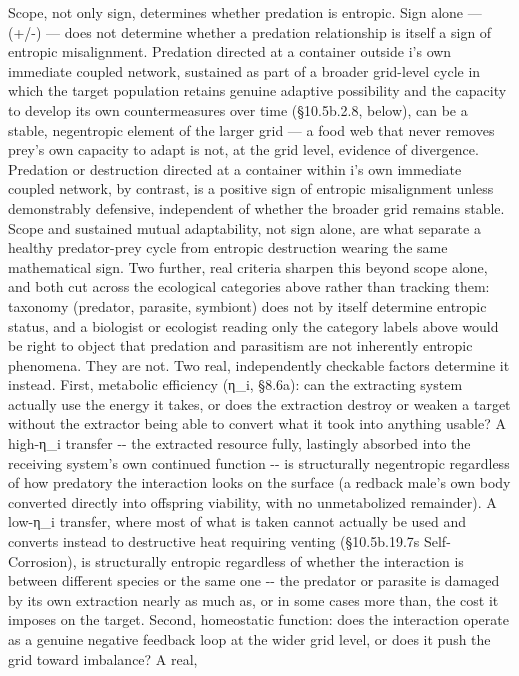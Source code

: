 \documentclass[
]{article}
\begin{document}
Scope, not only sign, determines whether predation is entropic. Sign
alone --- (+/-) --- does not determine whether a predation relationship
is itself a sign of entropic misalignment. Predation directed at a
container outside i's own immediate coupled network, sustained as part
of a broader grid-level cycle in which the target population retains
genuine adaptive possibility and the capacity to develop its own
countermeasures over time (§10.5b.2.8, below), can be a stable,
negentropic element of the larger grid --- a food web that never removes
prey's own capacity to adapt is not, at the grid level, evidence of
divergence. Predation or destruction directed at a container within i's
own immediate coupled network, by contrast, is a positive sign of
entropic misalignment unless demonstrably defensive, independent of
whether the broader grid remains stable. Scope and sustained mutual
adaptability, not sign alone, are what separate a healthy predator-prey
cycle from entropic destruction wearing the same mathematical sign. Two
further, real criteria sharpen this beyond scope alone, and both cut
across the ecological categories above rather than tracking them:
taxonomy (predator, parasite, symbiont) does not by itself determine
entropic status, and a biologist or ecologist reading only the category
labels above would be right to object that predation and parasitism are
not inherently entropic phenomena. They are not. Two real, independently
checkable factors determine it instead. First, metabolic efficiency
(η\_i, §8.6a): can the extracting system actually use the energy it
takes, or does the extraction destroy or weaken a target without the
extractor being able to convert what it took into anything usable? A
high-η\_i transfer -\/- the extracted resource fully, lastingly absorbed
into the receiving system's own continued function -\/- is structurally
negentropic regardless of how predatory the interaction looks on the
surface (a redback male's own body converted directly into offspring
viability, with no unmetabolized remainder). A low-η\_i transfer, where
most of what is taken cannot actually be used and converts instead to
destructive heat requiring venting (§10.5b.19.7s Self-Corrosion), is
structurally entropic regardless of whether the interaction is between
different species or the same one -\/- the predator or parasite is
damaged by its own extraction nearly as much as, or in some cases more
than, the cost it imposes on the target. Second, homeostatic function:
does the interaction operate as a genuine negative feedback loop at the
wider grid level, or does it push the grid toward imbalance? A real,
\end{document}

